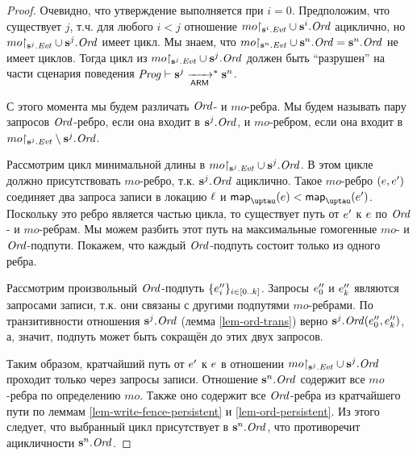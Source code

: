\begin{proof}
  Очевидно, что утверждение выполняется при $i = 0$.
  Предположим, что существует $j$, т.ч. для любого $i < j$ отношение
  $mo{\restriction_{\mathbf{s}^i.\mathit{Evt}}} \cup \mathbf{s}^i.\mathit{Ord}$ ациклично, но
  $mo{\restriction_{\mathbf{s}^j.\mathit{Evt}}} \cup \mathbf{s}^j.\mathit{Ord}$ имеет цикл.
  Мы знаем, что $mo{\restriction_{\mathbf{s}^n.\mathit{Evt}}} \cup \mathbf{s}^n.\mathit{Ord} = \mathbf{s}^n.\mathit{Ord}$ не имеет циклов.
  Тогда цикл из $mo{\restriction_{\mathbf{s}^j.\mathit{Evt}}} \cup \mathbf{s}^j.\mathit{Ord}$ должен быть ``разрушен''
  на части сценария поведения $\mathit{Prog} \vdash \mathbf{s}^j \xrightarrow[\mathsf{ARM}]{}^{*} \mathbf{s}^n$.
  
  С этого момента мы будем различать $\mathit{Ord}$- и $mo$-ребра.
  Мы будем называть пару запросов $\mathit{Ord}$-ребро, если она входит в $\mathbf{s}^j.\mathit{Ord}$,
  и  $mo$-ребром, если она входит в $mo{\restriction_{\mathbf{s}^j.\mathit{Evt}}} \setminus \mathbf{s}^j.\mathit{Ord}$.

Рассмотрим цикл минимальной длины в ${mo{\restriction_{\mathbf{s}^j.\mathit{Evt}}}} \cup \mathbf{s}^j.\mathit{Ord}$.
В этом цикле должно присутствовать $mo$-ребро, т.к. $\mathbf{s}^j.\mathit{Ord}$ ациклично.
Такое $mo$-ребро $(e, e')$ соединяет два запроса записи в локацию $\ell$ %
и $\taumapping(\e) < \taumapping(\e')$.
Поскольку это ребро является частью цикла, то существует путь от $e'$ к $e$ по
$\mathit{Ord}$- и $mo$-ребрам. Мы можем разбить этот путь на максимальные гомогенные $mo$- и $\mathit{Ord}$-подпути.
Покажем, что каждый $\mathit{Ord}$-подпуть состоит только из одного ребра.

Рассмотрим произвольный $\mathit{Ord}$-подпуть $\{e''_i\}_{i \in [0..k]}$.
Запросы $e''_0$ и $e''_k$ являются запросами записи, т.к. они связаны с другими подпутями
$mo$-ребрами.
По транзитивности отношения $\mathbf{s}^j.\mathit{Ord}$ (лемма \ref{lem-ord-trans})
верно $\mathbf{s}^j.\mathit{Ord}(e''_0, e''_k)$, а, значит, подпуть может быть сокращён до этих
двух запросов.

Таким образом, кратчайший путь от $e'$ к $e$ в отношении
${mo{\restriction_{\mathbf{s}^j.\mathit{Evt}}}} \cup \mathbf{s}^j.\mathit{Ord}$ проходит только через запросы записи.
Отношение $\mathbf{s}^n.\mathit{Ord}$ содержит все $mo$-ребра по определению $mo$. Также оно
содержит все $\mathit{Ord}$-ребра из кратчайшего пути по леммам \ref{lem-write-fence-persistent} и
\ref{lem-ord-persistent}. Из этого следует, что выбранный цикл присутствует в $\mathbf{s}^n.\mathit{Ord}$,
что противоречит ацикличности $\mathbf{s}^n.\mathit{Ord}$.
\end{proof}

